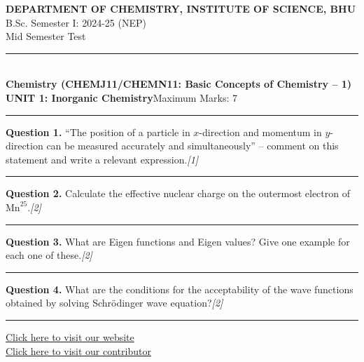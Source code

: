 \documentclass[11pt,a4paper]{article}
\newcommand{\pts}[1]{\hfill \textit{[#1]}}
\begin{document}
\begin{center}
  {\large\bfseries DEPARTMENT OF CHEMISTRY, INSTITUTE OF SCIENCE, BHU}\\[2pt]
  {\normalsize B.Sc. Semester I: 2024-25 (NEP)}\\[2pt]
  {\normalsize Mid Semester Test}\\[6pt]
  \rule{0.8\linewidth}{0.5pt}\\[6pt]
  {\large\bfseries Chemistry (CHEMJ11/CHEMN11: Basic Concepts of Chemistry -- 1)}\\[4pt]
  {\normalsize\bfseries UNIT 1: Inorganic Chemistry}\hfill {\normalsize Maximum Marks: 7}
\end{center}

\rule{\linewidth}{0.4pt}

\smallskip

\bigskip

\noindent \textbf{Question 1.} ``The position of a particle in $x$-direction and momentum in $y$-direction can be measured accurately and simultaneously'' -- comment on this statement and write a relevant expression.\pts{1}

\medskip\rule{\linewidth}{0.2pt}\medskip

\noindent \textbf{Question 2.} Calculate the effective nuclear charge on the outermost electron of $\text{Mn}^{25}$.\pts{2}

\medskip\rule{\linewidth}{0.2pt}\medskip

\noindent \textbf{Question 3.} What are Eigen functions and Eigen values? Give one example for each one of these.\pts{2}

\medskip\rule{\linewidth}{0.2pt}\medskip

\noindent \textbf{Question 4.} What are the conditions for the acceptability of the wave functions obtained by solving Schrödinger wave equation?\pts{2}

\vfill
\rule{\linewidth}{0.4pt}

\begin{center}\small
\href{https://bhu-exam.vercel.app/}{Click here to visit our website}\\[4pt]
\href{https://me-aryan.vercel.app/}{Click here to visit our contributor}
\end{center}
\end{document}
